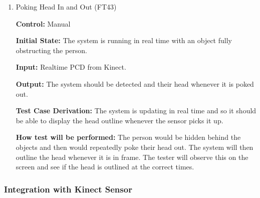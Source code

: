 \documentclass[12pt, titlepage]{article}
\begin{document}
\begin{enumerate}
  \item{Poking Head In and Out (FT43)\label{FT43}}

  \textbf{Control:} Manual

  \textbf{Initial State:} The system is running in real time with an object fully obstructing the person.

  \textbf{Input:} Realtime PCD from Kinect.

  \textbf{Output:} The system should be detected and their head whenever it is poked out.

  \textbf{Test Case Derivation:} The system is updating in real time and so it should be able to display the head outline whenever the sensor picks it up.

  \textbf{How test will be performed:} The person would be hidden behind the objects and then would repeatedly poke their head out. The system will then outline the head whenever it is in frame. The tester will observe this on the screen and see if the head is outlined at the correct times.
\end{enumerate} 

\subsubsection{Integration with Kinect Sensor}
\end{document}
